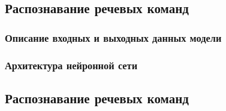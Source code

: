 \subsection{Распознавание речевых команд}
\subsubsection{Описание входных и выходных данных модели}
\subsubsection{Архитектура нейронной сети}
\subsubsection{}


\subsection{Распознавание речевых команд}